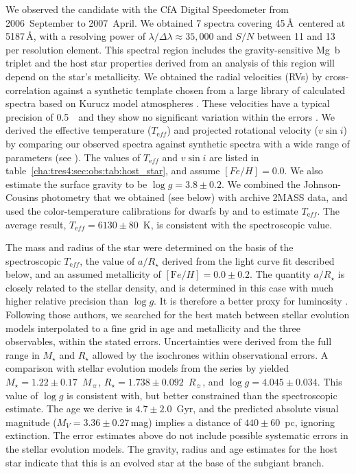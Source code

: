 We observed the candidate with the CfA Digital Speedometer \citep{Latham:ASP:1992a} from 2006~September to 2007~April.
We obtained 7 spectra covering 45\,\AA\ centered
at 5187\,\AA, with a resolving power of
$\lambda/\Delta\lambda \approx 35,\!000$ and $S/N$ between 11 and 13 per resolution element.
This spectral region includes the gravity-sensitive Mg~b triplet and the host star properties derived from an analysis of this region will depend on the star's metallicity.
We obtained the radial velocities (RVs) by
cross-correlation against a synthetic template chosen from a large library of
calculated spectra based on Kurucz model atmospheres
\citep[see][]{Nordstroem_Latham_Morse:aa:1994a, Latham_Stefanik_Torres:aj:2002a}.
These velocities have a typical precision of
0.5~\kms\ and they show no significant variation within the errors
. We derived the effective temperature ($T_{\mathrm eff}$) and projected rotational velocity ($v\sin{i}$) by comparing our observed spectra against synthetic spectra with a wide range of parameters (see \citealt*{Torres_Neuhauser_Guenther:aj:2002a}).
The values of $T_{\mathrm eff}$ and $v \sin i$ are listed in table~\ref{cha:tres4:sec:obs:tab:host_star}, and assume $[Fe/H]=0.0$. We also estimate the surface gravity to be \mbox{$\log g = 3.8 \pm 0.2$}.
We combined the Johnson-Cousins photometry that we obtained (see
below) with archive 2MASS data, and used the
color-temperature calibrations for dwarfs by \citet{Ramirez_Melendez:apj:2005b} and \citet*{Casagrande_Portinari_Flynn:mnras:2006a} to estimate
$T_{\mathrm eff}$. The average result, $T_{\mathrm eff} = 6130 \pm 80$~K,
is consistent with the spectroscopic value.

The mass and radius of the star were determined on the basis of the spectroscopic $T_{\mathrm eff}$,
the value of $a/R_{\star}$ derived from the light curve fit described below, and
an assumed metallicity of $\left [ {\mathrm Fe/H} \right ] = 0.0 \pm 0.2$. The
quantity $a/R_{\star}$ is closely related to the stellar density, and is
determined in this case with much higher relative precision than $\log g$. It
is therefore a better proxy for luminosity \citep[see][]{Sozzetti_Torres_Charbonneau:apj:2007a}.
Following those authors, we searched for the best match between stellar evolution models interpolated to a fine grid in age and metallicity and the three observables,
within the stated errors.
Uncertainties were derived from the full range in $M_\star$ and $R_\star$ allowed by the isochrones within observational errors.
A comparison with stellar evolution models from the series by \citet{Yi_Demarque_Kim:apjs:2001a} yielded \mbox{$M_{\star} = 1.22 \pm 0.17$~$M_{\sun}$}, \mbox{$R_{\star} = 1.738 \pm 0.092$~$R_{\sun}$}, and
\mbox{$\log g = 4.045 \pm 0.034$}. This value of $\log g$ is consistent with, but
better constrained than the spectroscopic estimate. The age we derive is
$4.7 \pm 2.0$~Gyr, and the predicted absolute visual magnitude
(\mbox{$M_V = 3.36 \pm 0.27$}\,mag) implies a distance of \mbox{$440 \pm 60$~pc}, ignoring extinction.
The error estimates above do not include possible systematic errors in the stellar evolution models.
The gravity, radius and age estimates for the host star indicate that this is an evolved star at the base of the subgiant branch.

